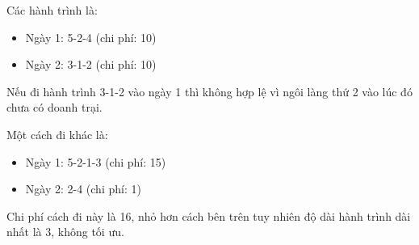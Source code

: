 Các hành trình là:
\begin{itemize}
	\item Ngày 1: 5-2-4 (chi phí: 10)
	\item Ngày 2: 3-1-2 (chi phí: 10)
\end{itemize}

Nếu đi hành trình 3-1-2 vào ngày 1 thì không hợp lệ vì ngôi làng thứ 2 vào lúc đó chưa có doanh trại.

Một cách đi khác là:
\begin{itemize}
	\item Ngày 1: 5-2-1-3 (chi phí: 15)
	\item Ngày 2: 2-4 (chi phí: 1)
\end{itemize}

Chi phí cách đi này là 16, nhỏ hơn cách bên trên tuy nhiên độ dài hành trình dài nhất là 3, không tối ưu.
\begin{itemize}
\end{itemize}